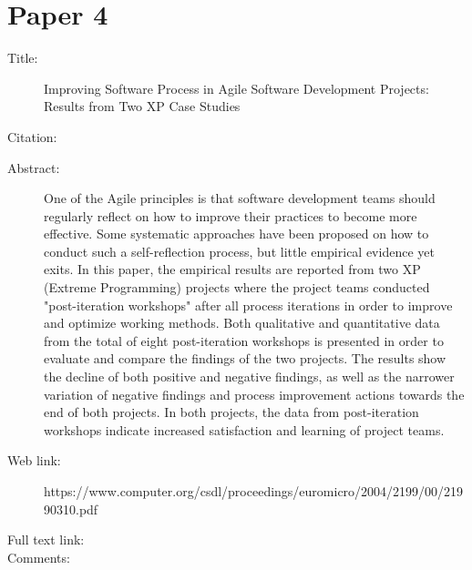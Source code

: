 \documentclass{scrartcl}
\begin{document}
\section*{Paper 4}
\begin{description}
\item[Title:] Improving Software Process in Agile Software Development Projects: Results from Two XP Case Studies
\item[Citation:] \cite{bibtex_key}
\item[Abstract:] One of the Agile principles is that software development teams should regularly reflect on how to improve their practices to become more effective. Some systematic approaches have been proposed on how to conduct such a self-reflection process, but little empirical evidence yet exits. In this paper, the empirical results are reported from two XP (Extreme Programming) projects where the project teams conducted "post-iteration workshops" after all process iterations in order to improve and optimize working methods. Both qualitative and quantitative data from the total of eight post-iteration workshops is presented in order to evaluate and compare the findings of the two projects. The results show the decline of both positive and negative findings, as well as the narrower variation of negative findings and process improvement actions towards the end of both projects. In both projects, the data from post-iteration workshops indicate increased satisfaction and learning of project teams.
\item[Web link:] https://www.computer.org/csdl/proceedings/euromicro/2004/2199/00/21990310.pdf
\item[Full text link:] 
\item[Comments:] 
\end{description}
\end{document}
